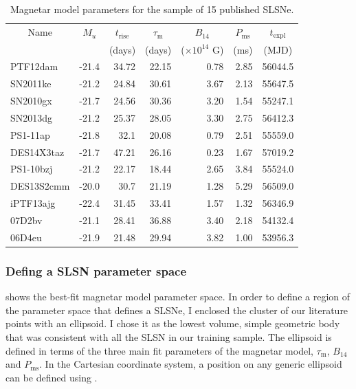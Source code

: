 \begin{table}
\begin{center}
\caption{Magnetar model parameters for the sample of 15 published SLSNe.}
\label{table:Magnetar}
\begin{tabular}{|l|r|r|r|r|r|r|}
\hline
  \multicolumn{1}{|c|}{Name} &
  \multicolumn{1}{c|}{$M_u$} &
  \multicolumn{1}{c|}{$t_\mathrm{rise}$} &
  \multicolumn{1}{c|}{$\tau_\mathrm{m}$} &
  \multicolumn{1}{c|}{$B_{14}$} &
  \multicolumn{1}{c|}{$P_{\mathrm{ms}}$} &
  \multicolumn{1}{c|}{$t_\mathrm{expl}$} \\ & &
  \multicolumn{1}{c|}{(days)} &
  \multicolumn{1}{c|}{(days)} &
  \multicolumn{1}{c|}{($\times10^{14}$ G)} &
  \multicolumn{1}{c|}{(ms)} &
  \multicolumn{1}{c|}{(MJD)} \\
\hline
  PTF12dam & -21.4 & 34.72 & 22.15 & 0.78 & 2.85 & 56044.5\\
  SN2011ke & -21.2 & 24.84 & 30.61 & 3.67 & 2.13 & 55647.5\\
  SN2010gx & -21.7 & 24.56 & 30.36 & 3.20 & 1.54 & 55247.1\\
  SN2013dg & -21.2 & 25.37 & 28.05 & 3.30 & 2.75 & 56412.3\\
  PS1-11ap & -21.8 & 32.1 & 20.08 & 0.79 & 2.51 & 55559.0\\
  DES14X3taz & -21.7 & 47.21 & 26.16 & 0.23 & 1.67 & 57019.2\\
  PS1-10bzj & -21.2 & 22.17 & 18.44 & 2.65 & 3.84 & 55524.0\\
  DES13S2cmm & -20.0 & 30.7 & 21.19 & 1.28 & 5.29 & 56509.0\\
  iPTF13ajg & -22.4 & 31.45 & 33.41 & 1.57 & 1.32 & 56346.9\\
  07D2bv & -21.1 & 28.41 & 36.88 & 3.40 & 2.18 & 54132.4\\
  06D4eu & -21.9 & 21.48 & 29.94 & 3.82 & 1.00 & 53956.3\\
\hline\end{tabular}
\end{center}
\end{table}

\subsubsection{Defing a SLSN parameter space} \label{sec:Definition}
 shows the best-fit magnetar model parameter space. In order to define a region of the parameter space that defines a SLSNe, I enclosed the cluster of our literature points with an ellipsoid. I chose it as the lowest volume, simple geometric body that was consistent with all the SLSN in our training sample. The ellipsoid is defined in terms of the three main fit parameters of the magnetar model, $\tau_\mathrm{m}$, $B_{14}$ and $P_{\mathrm{ms}}$. In the Cartesian coordinate system, a position on any generic ellipsoid can be defined using .

